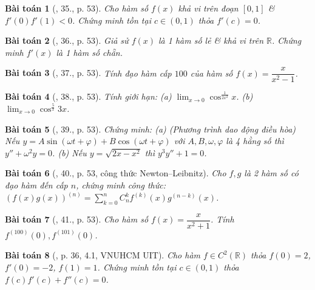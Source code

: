 \documentclass{article}
\newtheorem{baitoan}{Bài toán}
\begin{document}
\begin{baitoan}[\cite{TLCT_BT_dai_so_giai_tich_11}, 35., p. 53]
	Cho hàm số $f(x)$ khả vi trên đoạn $[0,1]$ \& $f'(0)f'(1) < 0$. Chứng minh tồn tại $c\in(0,1)$ thỏa $f'(c) = 0$.
\end{baitoan}

\begin{baitoan}[\cite{TLCT_BT_dai_so_giai_tich_11}, 36., p. 53]
	Giả sử $f(x)$ là 1 hàm số lẻ \& khả vi trên $\mathbb{R}$. Chứng minh $f'(x)$ là 1 hàm số chẵn.
\end{baitoan}

\begin{baitoan}[\cite{TLCT_BT_dai_so_giai_tich_11}, 37., p. 53]
	Tính đạo hàm cấp $100$ của hàm số $f(x) = \dfrac{x}{x^2 - 1}$.
\end{baitoan}

\begin{baitoan}[\cite{TLCT_BT_dai_so_giai_tich_11}, 38., p. 53]
	Tính giới hạn: (a) $\lim_{x\to0} \cos^{\frac{1}{2x^2}} x$. (b) $\lim_{x\to0} \cos^{\frac{5}{x}} 3x$.
\end{baitoan}

\begin{baitoan}[\cite{TLCT_BT_dai_so_giai_tich_11}, 39., p. 53]
	Chứng minh: (a) {\rm (Phương trình dao động điều hòa)} Nếu $y = A\sin(\omega t + \varphi) + B\cos(\omega t + \varphi)$ với $A,B,\omega,\varphi$ là 4 hằng số thì $y'' + \omega^2y = 0$. (b) Nếu $y = \sqrt{2x - x^2}$ thì $y^3y'' + 1 = 0$.
\end{baitoan}

\begin{baitoan}[\cite{TLCT_BT_dai_so_giai_tich_11}, 40., p. 53, công thức Newton--Leibnitz]
	Cho $f,g$ là 2 hàm số có đạo hàm đến cấp $n$, chứng minh công thức: $(f(x)g(x))^{(n)} = \sum_{k=0}^n C_n^kf^{(k)}(x)g^{(n-k)}(x)$.
\end{baitoan}

\begin{baitoan}[\cite{TLCT_BT_dai_so_giai_tich_11}, 41., p. 53]
	Cho hàm số $f(x) = \dfrac{x}{x^2 + 1}$. Tính $f^{(100)}(0),f^{(101)}(0)$.
\end{baitoan}


\begin{baitoan}[\cite{VMS_VMC2023}, p. 36, 4.1, VNUHCM UIT]
	Cho hàm $f\in C^2(\mathbb{R})$ thỏa $f(0) = 2$, $f'(0) = -2$, $f(1) = 1$. Chứng minh tồn tại $c\in(0,1)$ thỏa $f(c)f'(c) + f''(c) = 0$.
\end{baitoan}
\end{document}
